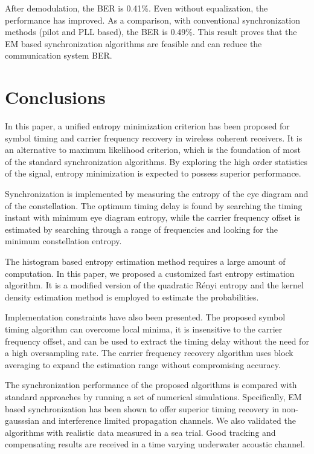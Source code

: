 \documentclass[journal,comsoc,onecolumn, 12pt,draftclsnofoot]{IEEEtran}
\begin{document}
After demodulation, the BER is 0.41\%. Even without equalization, the performance has improved. 
As a comparison, with conventional synchronization methods (pilot and PLL based), the BER is 0.49\%.
This result proves that the EM based synchronization algorithms are feasible and can reduce the communication system BER.


\section{Conclusions}
\label{sec:conc}
In this paper, a unified entropy minimization criterion has been proposed for symbol timing and carrier frequency recovery in wireless coherent receivers.
It is an alternative to maximum likelihood criterion, which is the foundation of most of the standard synchronization algorithms. 
By exploring the high order statistics of the signal, entropy minimization is expected to possess superior performance. 

Synchronization is implemented by measuring the entropy of the eye diagram and of the constellation.
% 
% 
The optimum timing delay is found by searching the timing instant with minimum eye diagram entropy, while the carrier frequency offset is estimated by searching through a range of frequencies and looking for the minimum constellation entropy.  

The histogram based entropy estimation method requires a large amount of computation.
In this paper, we proposed a customized fast entropy estimation algorithm.
It is a modified version of the quadratic R\'enyi entropy and the kernel density estimation method is employed to estimate the probabilities.

Implementation constraints have also been presented. 
The proposed symbol timing algorithm can overcome local minima, it is  insensitive to the carrier frequency offset, and can be used to extract the timing delay without the need for a high oversampling rate.
The carrier frequency recovery algorithm uses block averaging to expand the estimation range without compromising accuracy. 

The synchronization performance of the proposed algorithms is compared with standard approaches by running a set of numerical simulations.
Specifically, EM based synchronization has been shown to offer superior timing recovery in non-gausssian and interference limited propagation channels.
% 
% 
We also validated the algorithms with realistic data measured in a sea trial.
Good tracking and compensating results are received in a time varying underwater acoustic channel.


\end{document}
